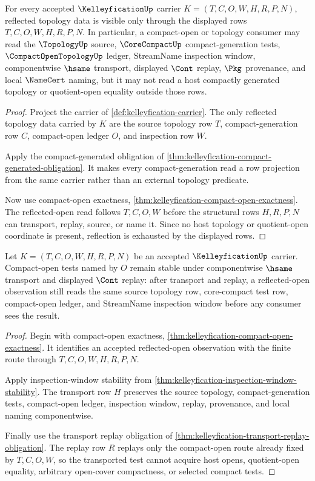 \begin{theorem}
\label{thm:kelleyfication-carrier-reflection}
For every accepted $\KelleyficationUp$ carrier $K=(T,C,O,W,H,R,P,N)$, reflected topology data is visible only through the displayed rows $T,C,O,W,H,R,P,N$. In particular, a compact-open or topology consumer may read the $\TopologyUp$ source, $\CoreCompactUp$ compact-generation tests, $\CompactOpenTopologyUp$ ledger, StreamName inspection window, componentwise $\hsame$ transport, displayed $\Cont$ replay, $\Pkg$ provenance, and local $\NameCert$ naming, but it may not read a host compactly generated topology or quotient-open equality outside those rows.
\end{theorem}
\begin{proof}
Project the carrier of \autoref{def:kelleyfication-carrier}. The only reflected topology data carried by $K$ are the source topology row $T$, compact-generation row $C$, compact-open ledger $O$, and inspection row $W$.

Apply the compact-generated obligation of \autoref{thm:kelleyfication-compact-generated-obligation}. It makes every compact-generation read a row projection from the same carrier rather than an external topology predicate.

Now use compact-open exactness, \autoref{thm:kelleyfication-compact-open-exactness}. The reflected-open read follows $T,C,O,W$ before the structural rows $H,R,P,N$ can transport, replay, source, or name it. Since no host topology or quotient-open coordinate is present, reflection is exhausted by the displayed rows.
\end{proof}

\begin{theorem}
\label{thm:kelleyfication-compact-open-test-stability}
Let $K=(T,C,O,W,H,R,P,N)$ be an accepted $\KelleyficationUp$ carrier. Compact-open tests named by $O$ remain stable under componentwise $\hsame$ transport and displayed $\Cont$ replay: after transport and replay, a reflected-open observation still reads the same source topology row, core-compact test row, compact-open ledger, and StreamName inspection window before any consumer sees the result.
\end{theorem}
\begin{proof}
Begin with compact-open exactness, \autoref{thm:kelleyfication-compact-open-exactness}. It identifies an accepted reflected-open observation with the finite route through $T,C,O,W,H,R,P,N$.

Apply inspection-window stability from \autoref{thm:kelleyfication-inspection-window-stability}. The transport row $H$ preserves the source topology, compact-generation tests, compact-open ledger, inspection window, replay, provenance, and local naming componentwise.

Finally use the transport replay obligation of \autoref{thm:kelleyfication-transport-replay-obligation}. The replay row $R$ replays only the compact-open route already fixed by $T,C,O,W$, so the transported test cannot acquire host opens, quotient-open equality, arbitrary open-cover compactness, or selected compact tests.
\end{proof}

